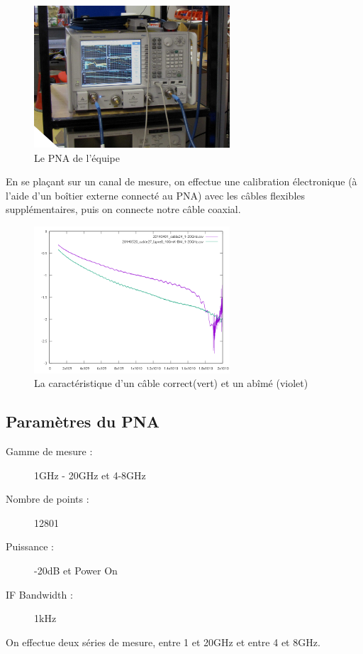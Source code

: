 \begin{figure}[h]
    \begin{center}
        \includegraphics[width=0.65\textwidth]{Images/VNA}
        \caption{Le PNA de l'équipe}
        \label{PNA}
    \end{center}
\end{figure}

En se plaçant sur un canal de mesure, on effectue une calibration électronique (à l'aide d'un boîtier externe connecté au PNA) avec les câbles flexibles supplémentaires, puis on connecte notre câble coaxial.

\begin{figure}
    \begin{center}
        \includegraphics[width=0.65\textwidth]{Images/Caracs/abime2.png}
        \caption{La caractéristique d'un câble correct(vert) et un abîmé (violet)}
        \label{Carac1}
    \end{center}
\end{figure}

\subsection{Paramètres du PNA}
\begin{description}
    \item[Gamme de mesure :] 1GHz - 20GHz et 4-8GHz
    \item[Nombre de points :] 12801
    \item[Puissance :] -20dB et Power On
    \item[IF Bandwidth :] 1kHz
\end{description}

On effectue deux séries de mesure, entre 1 et 20GHz et entre 4 et 8GHz.
